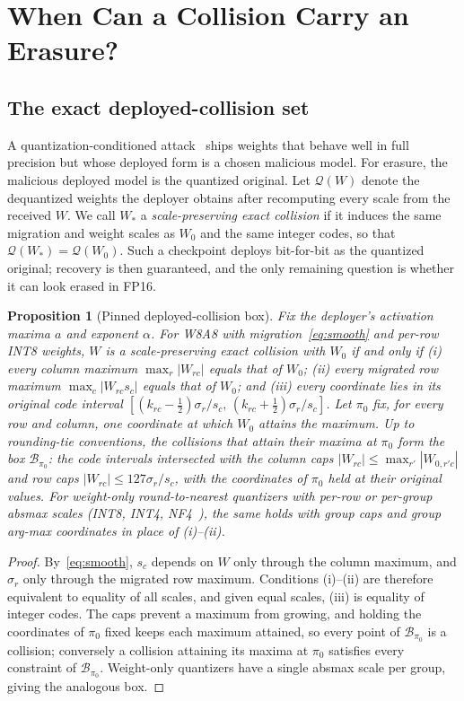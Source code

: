 \documentclass[conference]{IEEEtran}
\newtheorem{proposition}{Proposition}
\begin{document}
\section{When Can a Collision Carry an Erasure?}
\label{sec:theory}
\subsection{The exact deployed-collision set}
A quantization-conditioned attack~\cite{egashira2024} ships weights that behave well
in full precision but whose deployed form is a chosen malicious model. For erasure,
the malicious deployed model is the quantized original. Let $\mathcal{Q}(W)$
denote the dequantized weights the deployer obtains after recomputing every scale
from the received $W$. We call $W_*$ a \emph{scale-preserving exact collision} if it
induces the same migration and weight scales as $W_0$ and the same integer codes, so
that $\mathcal{Q}(W_*)=\mathcal{Q}(W_0)$. Such a checkpoint deploys bit-for-bit as the
quantized original; recovery is then guaranteed, and the only remaining question is
whether it can look erased in FP16.

\begin{proposition}[Pinned deployed-collision box]
\label{prop:box}
Fix the deployer's activation maxima $a$ and exponent $\alpha$. For
W8A8 with migration~\eqref{eq:smooth} and per-row INT8 weights, $W$ is a
scale-preserving exact collision with $W_0$ if and only if
(i) every column maximum $\max_r|W_{rc}|$ equals that of $W_0$;
(ii) every migrated row maximum $\max_c|W_{rc}s_c|$ equals that of $W_0$; and
(iii) every coordinate lies in its original code interval
$[(k_{rc}-\tfrac12)\sigma_r/s_c,\,(k_{rc}+\tfrac12)\sigma_r/s_c]$.
Let $\pi_0$ fix, for every row and column, one coordinate at which $W_0$ attains the
maximum. Up to rounding-tie conventions, the collisions that attain their maxima at
$\pi_0$ form the box $\mathcal{B}_{\pi_0}$: the code intervals intersected with the
column caps $|W_{rc}|\le\max_{r'}|W_{0,r'c}|$ and row caps $|W_{rc}|\le127\sigma_r/s_c$,
with the coordinates of $\pi_0$ held at their original values. For weight-only
round-to-nearest quantizers with per-row or per-group absmax scales (INT8, INT4,
NF4~\cite{qlora}), the same holds with group caps and group arg-max coordinates in
place of (i)--(ii).
\end{proposition}
\begin{proof}
By~\eqref{eq:smooth}, $s_c$ depends on $W$ only through the column maximum, and
$\sigma_r$ only through the migrated row maximum. Conditions (i)--(ii) are therefore
equivalent to equality of all scales, and given equal scales, (iii) is equality of
integer codes. The caps prevent a maximum from growing, and holding the coordinates of
$\pi_0$ fixed keeps each maximum attained, so every point of $\mathcal{B}_{\pi_0}$ is a
collision; conversely a collision attaining its maxima at $\pi_0$ satisfies every
constraint of $\mathcal{B}_{\pi_0}$. Weight-only quantizers have a single absmax scale
per group, giving the analogous box.
\end{proof}
\end{document}
